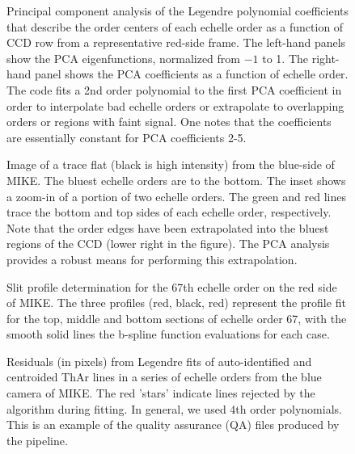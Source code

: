 \documentclass[12pt,preprint]{aastex}
\begin{document}
\begin{figure}
\caption{Principal component analysis of the Legendre polynomial coefficients
that describe the order centers of each echelle order as a function of CCD row
from a representative red-side frame.  The left-hand panels show the
PCA eigenfunctions, normalized from $-1$ to 1.  The right-hand panel
shows the PCA coefficients as a function of echelle order.  The code
fits a 2nd order polynomial to the first PCA coefficient in order to
interpolate bad echelle orders or extrapolate to overlapping orders or
regions with faint signal.  One notes that the coefficients are essentially
constant for PCA coefficients 2-5.
}
\label{fig:pca}
\end{figure}

\begin{figure}
\caption{Image of a trace flat (black is high intensity) from the blue-side
of MIKE.  The bluest echelle orders are to the bottom.  The inset shows
a zoom-in of a portion of two echelle orders.  The green and red lines
trace the bottom and top sides of each echelle order, respectively.  Note that
the order edges have been extrapolated into the bluest regions of the
CCD (lower right in the figure).  
The PCA analysis provides a robust means for performing
this extrapolation.}
\label{fig:trace}
\end{figure}

\begin{figure}
\caption{Slit profile determination for the 67th echelle order on the red side
of MIKE.  The three profiles (red, black, red)
represent the profile fit for the top, middle and bottom sections of echelle order 67,
with the smooth solid lines the b-spline function evaluations for each case.
}
\label{fig:slitflat}
\end{figure}

\begin{figure}
\caption{Residuals (in pixels) from Legendre fits of auto-identified
and centroided ThAr lines in a series of echelle orders from the
blue camera of MIKE.  The red 'stars' indicate lines rejected by
the algorithm during fitting.  In general, we used 4th order
polynomials.  This is an example of the quality assurance (QA) 
files produced by the pipeline.
}
\label{fig:wav1D}
\end{figure}
\end{document}
